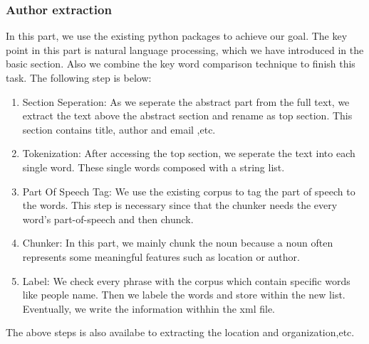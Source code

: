\subsubsection{Author extraction}
In this part, we use the existing python packages to achieve our goal. 
The key point in this part is natural language processing, which we have introduced in the basic section. 
Also we combine the key word comparison technique to finish this task. The following step is below:

\begin{enumerate}
	\item Section Seperation: As we seperate the abstract part from the full text, we extract the text above the abstract section and rename as top section. This section contains title, author and email ,etc.
	\item Tokenization: After accessing the top section, we seperate the text into each single word. These single words composed with a string list. 
	\item Part Of Speech Tag: We use the existing corpus to tag the part of speech to the words. This step is necessary since that the chunker needs the every word's part-of-speech and then chunck.
	\item Chunker: In this part, we mainly chunk the noun  because a noun often represents some meaningful features such as location or author.
	\item Label: We check every phrase with the corpus which contain specific words like people name. Then we labele the words and store within the new list. Eventually, we write the information withhin the xml file. 
\end{enumerate}


The above steps is also availabe to extracting the location and organization,etc.
